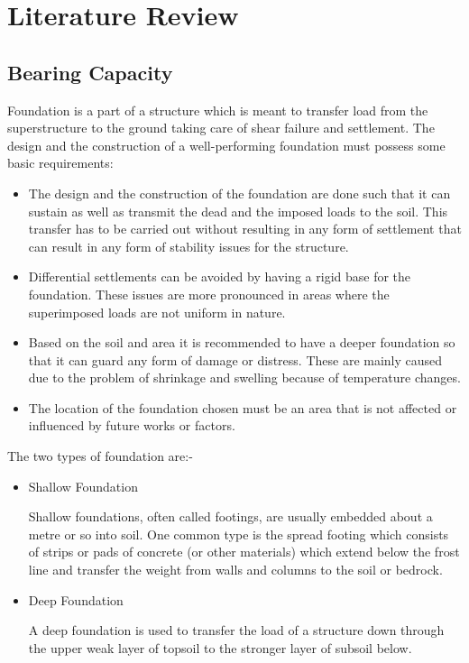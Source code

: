 \chapter{Literature Review}
\section{Bearing Capacity}
Foundation is a part of a structure which is meant to transfer load from the superstructure to the ground taking care of shear failure and settlement. The design and the construction of a well-performing foundation must possess some basic requirements: 
\begin{itemize}
	\item 	The design and the construction of the foundation are done such that it can sustain as well as transmit the dead and the imposed loads to the soil. This transfer has to be carried out without resulting in any form of settlement that can result in any form of stability issues for the structure.
	\item Differential settlements can be avoided by having a rigid base for the foundation. These issues are more pronounced in areas where the superimposed loads are not uniform in nature.
	\item Based on the soil and area it is recommended to have a deeper foundation so that it can guard any form of damage or distress. These are mainly caused due to the problem of shrinkage and swelling because of temperature changes.
	\item The location of the foundation chosen must be an area that is not affected or influenced by future works or factors.
\end{itemize}

The two types of foundation are:-
\begin{itemize}
  \item Shallow Foundation
  \par
  Shallow foundations, often called footings, are usually embedded about a metre or so into soil. One common type is the spread footing which consists of strips or pads of concrete (or other materials) which extend below the frost line and transfer the weight from walls and columns to the soil or bedrock.
  \item Deep Foundation
  \par
  A deep foundation is used to transfer the load of a structure down through the upper weak layer of topsoil to the stronger layer of subsoil below.
\end{itemize}

